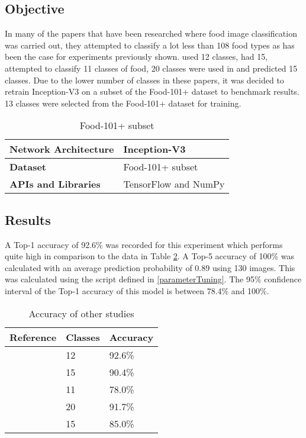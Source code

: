 \tocless\subsection{Objective}
In many of the papers that have been researched where food image classification was carried out, they attempted to classify a lot less than 108 food types as has been the case for experiments previously shown.
\parencite{novelSVM} used 12 classes, \parencite{pouladzadeh2014measuring} had 15, \parencite{LSL_2015} attempted to classify 11 classes of food, 20 classes were used in \parencite{chen2010toward} and \parencite{snap} predicted 15 classes.
Due to the lower number of classes in these papers, it was decided to retrain Inception-V3 on a subset of the Food-101+ dataset to benchmark results.
13 classes were selected from the Food-101+ dataset for training.

\begin{table}[h]
\centering
\caption{Food-101+ subset}
\label{my-label}
\begin{tabular}{|l|p{8cm}|}
\hline
\textbf{Network Architecture} & Inception-V3          \\ \hline
\textbf{Dataset}              & Food-101+ subset  \\ \hline
\textbf{APIs and Libraries}   & TensorFlow and NumPy                                                       \\ \hline
\end{tabular}
\end{table}

\tocless\subsection{Results}
A Top-1 accuracy of 92.6\% was recorded for this experiment which performs quite high in comparison to the data in Table \ref{classes_accuracy}.
A Top-5 accuracy of 100\% was calculated with an average prediction probability of 0.89 using 130 images.
This was calculated using the script defined in \ref{parameterTuning}.
The 95\% confidence interval of the Top-1 accuracy of this model is between 78.4\% and 100\%.

\begin{table}[]
\centering
\caption{Accuracy of other studies}
\label{classes_accuracy}
\begin{tabular}{|p{7cm}|l|l|}
\hline
\textbf{Reference}                       & \textbf{Classes} & \textbf{Accuracy}      \\ \hline
\parencite{novelSVM}                      & 12      & 92.6\%        \\ \hline
\parencite{pouladzadeh2014measuring} & 15      & 90.4\%       \\ \hline
\parencite{LSL_2015}           & 11      & 78.0\%          \\ \hline
\parencite{chen2010toward}      & 20      & 91.7\% \\ \hline
\parencite{snap}                      & 15      & 85.0\%         \\ \hline
\end{tabular}
\end{table}

